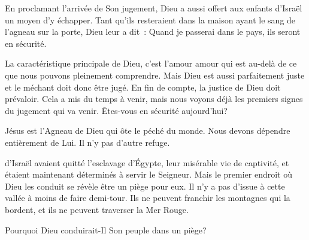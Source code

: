 En proclamant l'arrivée de Son jugement,
 Dieu a aussi offert aux enfants d'Israël un moyen d'y échapper.
 Tant qu'ils resteraient dans la maison ayant le sang de l'agneau sur la porte,
 Dieu leur a dit~:
 \og Quand je passerai dans le pays, ils seront en sécurité. \fg{}

La caractéristique principale de Dieu, c'est l'amour
 \ocadr{}amour qui est au-delà de ce que nous pouvons pleinement comprendre.
 Mais Dieu est aussi parfaitement juste et le méchant doit donc être jugé.
 En fin de compte, la justice de Dieu doit prévaloir.
 Cela a mis du temps à venir, mais nous voyons déjà les premiers signes
 du jugement qui va venir.
 Êtes-vous en sécurité aujourd'hui?


Jésus est l'Agneau de Dieu qui ôte le péché du monde.
 Nous devons dépendre entièrement de Lui. Il n'y pas d'autre refuge. 

\dvrule






 d'Israël avaient quitté l'esclavage d'Égypte,
 leur misérable vie de captivité,
 et étaient maintenant déterminés à servir le Seigneur.
 Mais le premier endroit où Dieu les conduit se révèle être un piège pour eux.
 Il n'y a pas d'issue à cette vallée à moins de faire demi-tour.
 Ils ne peuvent franchir les montagnes qui la bordent,
 et ils ne peuvent traverser la Mer Rouge.

Pourquoi Dieu conduirait-Il Son peuple dans un piège?


